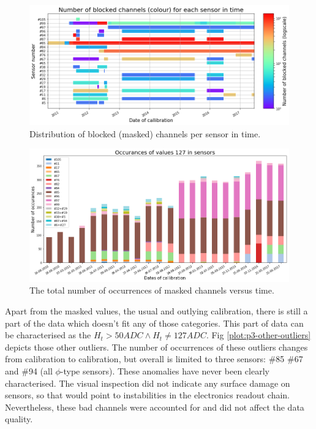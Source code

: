 \begin{figure}
    \centering
    \includegraphics[width=0.95\linewidth]{figures/chapter4/calib_analysis/P3-mask-time.png}
    \caption{Distribution of blocked (masked) channels per sensor in time.}
    \label{plot:p3-mask-time}
\end{figure}

\begin{figure}
    \centering
    \includegraphics[width=0.95\linewidth]{figures/chapter4/calib_analysis/P3-mask-time2.png}
    \caption{The total number of occurrences of masked channels versus time.}
    \label{plot:p3-mask-time2}
\end{figure}

Apart from the masked values, the usual and outlying calibration, there is still a part of the data which doesn't fit any of those categories.
This part of data can be characterised as the $H_{t} > 50 ADC \land H_{t} \neq 127 ADC$.
Fig \ref{plot:p3-other-outliers} depicts those other outliers. The number of occurrences of these outliers changes from calibration to calibration, but overall is limited to three sensors: \#85 \#67 and \#94 (all $\phi$-type sensors). These anomalies have never been clearly characterised. The visual inspection did not indicate any surface damage on sensors, so that would point to instabilities in the electronics readout chain. Nevertheless, these bad channels were accounted for and did not affect the data quality.


